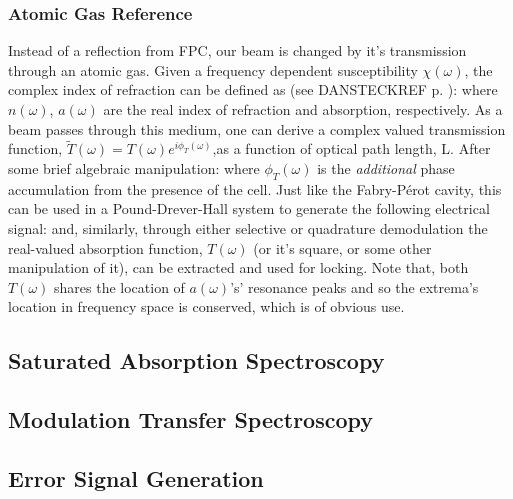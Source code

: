 \subsubsection{Atomic Gas Reference}

Instead of a reflection from FPC, our beam is changed by it's transmission through an atomic gas. Given a frequency dependent susceptibility $\chi(\omega)$, the complex index of refraction can be defined as (see DANSTECKREF p. ):
where $n(\omega)$, $a(\omega)$ are the real index of refraction and absorption, respectively. As a beam passes through this medium, one can derive a complex valued transmission function, $\tilde{T}(\omega)=T(\omega)e^{i\phi_T(\omega)}$,as a function of optical path length, L. After some brief algebraic manipulation:
where $\phi_T(\omega)$ is the \emph{additional} phase accumulation from the presence of the cell. Just like the Fabry-P{\'e}rot cavity, this can be used in a Pound-Drever-Hall system to generate the following electrical signal:
and, similarly, through either selective or quadrature demodulation the real-valued absorption function, $T(\omega)$ (or it's square, or some other manipulation of it), can be extracted and used for locking. Note that, both $T(\omega)$ shares the location of $a(\omega)$'s' resonance peaks and so the extrema's location in frequency space is conserved, which is of obvious use.

\subsection{Saturated Absorption Spectroscopy}



\subsection{Modulation Transfer Spectroscopy}

\subsection{Error Signal Generation}

